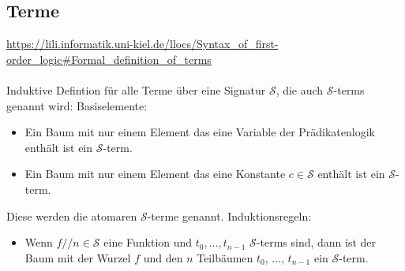 \documentclass{article}
\begin{document}
    \subsection{Terme}
    \url{https://lili.informatik.uni-kiel.de/llocs/Syntax_of_first-order_logic#Formal_definition_of_terms}\\\\
    Induktive Defintion für alle Terme über eine Signatur $\mathcal{S}$, die auch $\mathcal{S}$-terms genannt wird:
    Basiselemente:\\
    \begin{itemize}
        \item Ein Baum mit nur einem Element das eine Variable der Prädikatenlogik enthält ist ein $\mathcal{S}$-term.
        \item Ein Baum mit nur einem Element das eine Konstante $c \in \mathcal{S}$ enthält ist ein $\mathcal{S}$-term.
    \end{itemize}
    Diese werden die atomaren $\mathcal{S}$-terme genannt.
    Induktionsregeln:\\
    \begin{itemize}
        \item Wenn  $f/\!/n \in \mathcal S$ eine Funktion und $t_0, \dots, t_{n-1}$ $\mathcal S$-terms sind, dann ist der Baum mit der Wurzel $f$ und den $n$ Teilbäumen $t_0$, ..., $t_{n-1}$ ein $\mathcal S$-term.
    \end{itemize}
\end{document}
